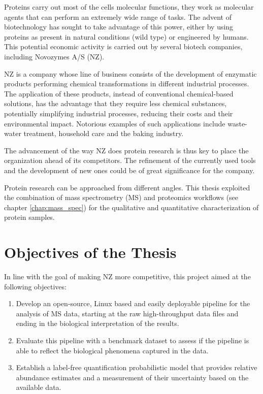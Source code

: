 Proteins carry out most of the cell\textquotesingle s molecular functions, they work as molecular agents that can perform an extremely wide range of tasks. The advent of biotechnology has sought to take advantage of this power, either by using proteins as present in natural conditions (wild type) or engineered by humans. This potential economic activity is carried out by several biotech companies, including Novozymes A/S (NZ).

\ac{NZ} is a company whose line of business consists of the development of enzymatic products performing chemical transformations in different industrial processes. The application of these products, instead of conventional chemical-based solutions, has the advantage that they require less chemical substances, potentially simplifying industrial processes, reducing their costs and their environmental impact. Notorious examples of such applications include waste-water treatment, household care and the baking industry.


The advancement of the way \ac{NZ} does protein research is thus key to place the organization ahead of its competitors. The refinement of the currently used tools and the development of new ones could be of great significance for the company. 

Protein research can be approached from different angles. This thesis exploited the combination of mass spectrometry (\ac{MS}) and proteomics workflows (see chapter \ref{chap:mass_spec}) for the qualitative and quantitative characterization of protein samples.



\section{Objectives of the Thesis}
\label{sec:objectives}

In line with the goal of making \ac{NZ} more competitive, this project aimed at the following objectives:

\begin{enumerate}

\item Develop an open-source, Linux based and easily deployable pipeline for the analysis of \ac{MS} data, starting at the raw high-throughput data files and ending in the  biological interpretation of the results.

\item Evaluate this pipeline with a benchmark dataset to assess if the pipeline is able to reflect the biological phenomena captured in the data.

\item Establish a label-free quantification probabilistic model that provides relative abundance estimates and a measurement of their uncertainty based on the available data.

\end{enumerate}

